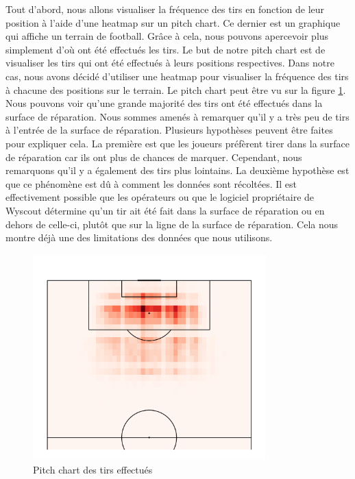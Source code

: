 \documentclass[12pt]{article}
\begin{document}
Tout d'abord, nous allons visualiser la fréquence des tirs en fonction de leur position à l'aide d'une heatmap sur un pitch chart.
Ce dernier est un graphique qui affiche un terrain de football.
Grâce à cela, nous pouvons apercevoir plus simplement d'où ont été effectués les tirs.
Le but de notre pitch chart est de visualiser les tirs qui ont été effectués à leurs positions respectives.
Dans notre cas, nous avons décidé d'utiliser une heatmap pour visualiser la fréquence des tirs à chacune des positions sur le terrain.
Le pitch chart peut être vu sur la figure \ref{fig:pitch_chart}.
Nous pouvons voir qu'une grande majorité des tirs ont été effectués dans la surface de réparation.
Nous sommes amenés à remarquer qu'il y a très peu de tirs à l'entrée de la surface de réparation.
Plusieurs hypothèses peuvent être faites pour expliquer cela.
La première est que les joueurs préfèrent tirer dans la surface de réparation car ils ont plus de chances de marquer. 
Cependant, nous remarquons qu'il y a également des tirs plus lointains.
La deuxième hypothèse est que ce phénomène est dû à comment les données sont récoltées.
Il est effectivement possible que les opérateurs ou que le logiciel propriétaire de Wyscout détermine qu'un tir ait été fait dans la surface de réparation ou en dehors de celle-ci, plutôt que sur la ligne de la surface de réparation.
Cela nous montre déjà une des limitations des données que nous utilisons.
\begin{figure}[htp]
    \centering
    \includegraphics[width=0.8\textwidth]{img/pitchChartFrequency.png}
    \caption{Pitch chart des tirs effectués}
    \label{fig:pitch_chart}
\end{figure}
\end{document}
